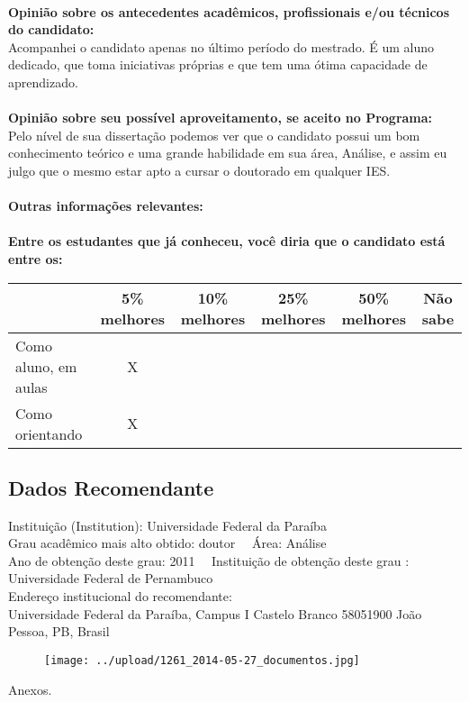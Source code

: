 \documentclass[11pt]{article}
\begin{document}
\\
\textbf{Opinião sobre os antecedentes acadêmicos, profissionais e/ou técnicos do candidato:}
\\Acompanhei o candidato apenas no último período do mestrado. É um aluno dedicado, que toma iniciativas próprias e que tem uma ótima capacidade de aprendizado.\\
\\
\textbf{Opinião sobre seu possível aproveitamento, se aceito no Programa:}
\\Pelo nível de sua dissertação podemos ver que o candidato possui um bom conhecimento teórico e uma grande habilidade em sua área, Análise, e assim eu julgo que o mesmo estar apto a cursar o doutorado em qualquer IES.\\ 
\\
\textbf{Outras informações relevantes:} \\
\\[0.3cm]
\textbf{Entre os estudantes que já conheceu, você diria que o candidato está entre os:}
\\
\begin{tabular}{|l|c|c|c|c|c|}
\hline
 & 5\% melhores & 10\% melhores & 25\% melhores & 50\% melhores & Não sabe \\
\hline
Como aluno, em aulas & X &  &  &  & \\
\hline
Como orientando & X &  &  &  & \\
\hline
\end{tabular}
\subsection*{Dados Recomendante} 
	Instituição (Institution): Universidade Federal da Paraíba
\\ 
	Grau acadêmico mais alto obtido: doutor
	\ \ Área: Análise
	\\
	Ano de obtenção deste grau: 2011
	\ \ 
	Instituição de obtenção deste grau : Universidade Federal de Pernambuco
	\\ 
	Endereço institucional do recomendante: \\ Universidade Federal da Paraíba, Campus I
Castelo Branco
58051900  João Pessoa, PB, Brasil
	
\begin{figure}[!htb]
\texttt{[image: ../upload/1261\_2014-05-27\_documentos.jpg]}
\end{figure} 
\begin{center}
Anexos.
\end{center}
\end{document}
